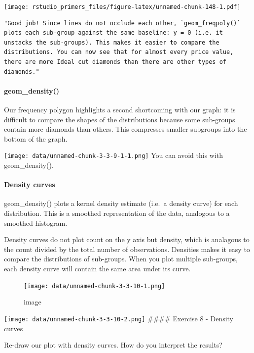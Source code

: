 \documentclass[
]{article}
\begin{document}
\texttt{[image: rstudio\_primers\_files/figure-latex/unnamed-chunk-148-1.pdf]}

\begin{verbatim}
"Good job! Since lines do not occlude each other, `geom_freqpoly()` plots each sub-group against the same baseline: y = 0 (i.e. it unstacks the sub-groups). This makes it easier to compare the distributions. You can now see that for almost every price value, there are more Ideal cut diamonds than there are other types of diamonds."
\end{verbatim}

\hypertarget{geom_density}{%
\paragraph{geom\_density()}\label{geom_density}}

Our frequency polygon highlights a second shortcoming with our graph: it
is difficult to compare the shapes of the distributions because some
sub-groups contain more diamonds than others. This compresses smaller
subgroups into the bottom of the graph.

\texttt{[image: data/unnamed-chunk-3-3-9-1-1.png]} You can avoid this
with geom\_density().

\hypertarget{density-curves}{%
\paragraph{Density curves}\label{density-curves}}

geom\_density() plots a kernel density estimate (i.e.~a density curve)
for each distribution. This is a smoothed representation of the data,
analogous to a smoothed histogram.

Density curves do not plot count on the y axis but density, which is
analagous to the count divided by the total number of observations.
Densities makes it easy to compare the distributions of sub-groups. When
you plot multiple sub-groups, each density curve will contain the same
area under its curve.

\begin{figure}
\centering
\texttt{[image: data/unnamed-chunk-3-3-10-1.png]}
\caption{image}
\end{figure}

\texttt{[image: data/unnamed-chunk-3-3-10-2.png]} \#\#\#\# Exercise 8 -
Density curves

Re-draw our plot with density curves. How do you interpret the results?
\end{document}
